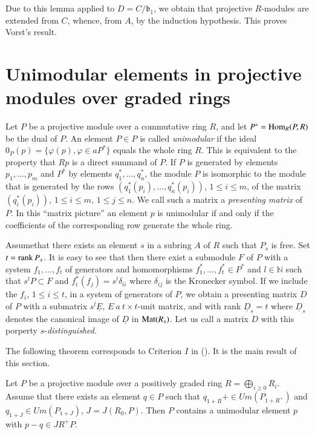 Due to this lemma applied to $D=C/\mathfrak{b}_{1}$, we obtain that
projective $R$-modules are extended from $C$, whence, from $A$, by the
induction hypothesis. This proves Vorst's result.

\section{Unimodular elements in projective modules over graded
rings}\label{chap10-sec2}

Let $P$ be a projective module over a commutative ring $R$, and let
$P^{*}=\operatorname{Hom}_{R}(P,R)$ be the dual of $P$. An element $P\in P$ is
called {\em unimodular} if the ideal $0_{P}(p)=\{\varphi(p),\varphi\in
aP^{*}\}$ equals the whole ring $R$. This is equivalent to the
property that $Rp$ is a direct summand of $P$. If $P$ is generated by
elements $p_{1},\ldots,p_{m}$ and $P^{*}$ by elements
$q^{*}_{1},\ldots,q^{*}_{n}$, the module $P$ is isomorphic to the
module that is generated by the rows
$(q^{*}_{1}(p_{i}),\ldots,q^{*}_{n}(p_{i}))$, $1\leq i\leq m$, of the
matrix $(q^{*}_{i}(p_{i}))$, $1\leq i\leq m$, $1\leq j\leq n$. We call
such a matrix a {\em presenting matrix} of $P$. In this ``matrix
picture'' an element $p$ is unimodular if and only if the coefficients
of the corresponding row generate the whole ring. 

Assume\pageoriginale that there exists an element $s$ in a subring $A$
of $R$ such that $P_{s}$ is free. Set $t=\operatorname{rank} P_{s}$. It is easy to
see that then there exist a submodule $F$ of $P$ with a system
$f_{1},\ldots,f_{t}$ of generators and homomorphisms
$f^{*}_{1},\ldots,f^{*}_{t}\in P^{*}$ and $l\in \mathbb{N}$ such that
$s^{l}P\subset F$ and $f^{*}_{i}(f_{j})=s^{l}\delta_{ii}$ where
$\delta_{ij}$ is the Kronecker symbol. If we include the $f_{i}$,
$1\leq i\leq t$, in a system of generators of $P$, we obtain a
presenting matrix $D$ of $P$ with a submatrix $s^{l}\underline{E}$,
$E \ a\ t\times t$-unit matrix, and with rank $\underline{D}_{s}=t$
where $\underline{D}_{s}$ denotes the canonical image of
$\underline{D}$ in $\operatorname{Mat}(R_{s})$. Let us call a matrix $D$ with this
porperty $s$-{\em distinguished.}

The following theorem corresponds to Criterion $I$ in
(\cite{chap10-Bh/Li/Ra}). It is the main result of this section.

\begin{subthm}\label{chap10-thm2.1}
Let $P$ be a projective module over a positively graded ring
$R=\bigoplus\limits_{i\geq 0}R_{i}$. Assume that there exists an
element $q\in P$ such that $q_{1+R}+\in Um(P_{1+R^{+}})$ and $q_{1+J}\in
Um(P_{1+J})$, $J=J(R_{0},P)$. Then $P$ contains a unimodular element
$p$ with $p-q\in JR^{+}P$. 
\end{subthm}

